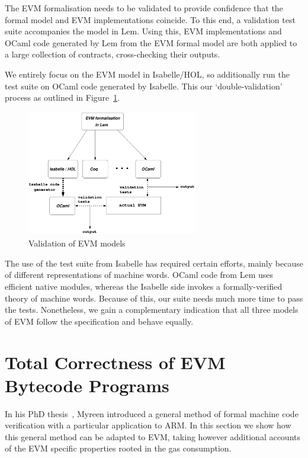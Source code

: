 \documentclass[sigplan,10pt,review]{acmart}\settopmatter{printfolios=true,printccs=false,printacmref=false}
\begin{document}
The EVM formalisation needs to be validated to provide confidence that the formal model
and EVM implementations coincide. To this end, a validation test suite accompanies
the model in Lem. Using this, EVM implementations and OCaml code generated by Lem from the EVM
formal model are both applied to a large collection of contracts, cross-checking their outputs.  

We entirely focus on the EVM model in Isabelle/HOL, so additionally run the test suite 
on OCaml code generated by Isabelle. This our `double-validation' 
process as outlined in Figure~\ref{fig:valid}.          
\begin{figure}[htbp]
\centering
\includegraphics[height=5.5cm, width=7.5cm]{images/evm_lem}    
        \caption{Validation of EVM models}
\label{fig:valid}
\end{figure}
The use of the test suite from Isabelle has required certain efforts, mainly because 
of different representations of machine words. OCaml code from Lem uses efficient native modules,
whereas the Isabelle side invokes a formally-verified theory of machine words.
Because of this, our suite needs much more time to pass the tests.
Nonetheless, we gain a complementary indication that all three models of EVM follow the specification
and behave equally.    
%
\section{Total Correctness of EVM Bytecode Programs}
\label{sec:corr}
In his PhD thesis~\cite{DBLP:phd/ethos/Myreen09}, Myreen introduced a general 
method of formal 
machine code verification with a particular application to ARM. In this section we show how
this general method can be adapted to EVM, taking however additional accounts of the EVM specific properties rooted in the 
gas consumption.
 
\end{document}
